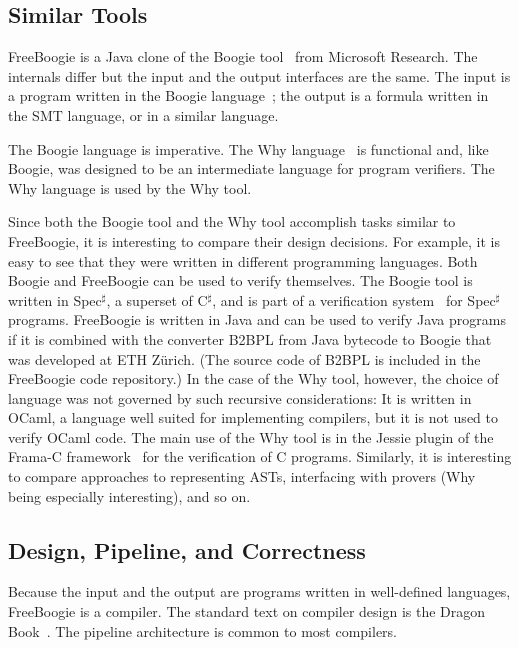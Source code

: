 \documentclass{llncs}
\newcommand{\csharp}{C$^\sharp$\xspace}
\newcommand{\specsharp}{Spec$^\sharp$\xspace}
\begin{document}
\subsection{Similar Tools}

FreeBoogie is a Java clone of the Boogie
tool~\cite{barnett2005boogie} from Microsoft Research. The
internals differ but the input and the output interfaces
are the same. The input is a program written in the Boogie
language~\cite{leino2008boogie,leino2010boogie}; the output is a
formula written in the SMT language, or in a similar language.

The Boogie language is imperative. The Why
language~\cite{filliatre2007why} is functional and, like
Boogie, was designed to be an intermediate language for program
verifiers. The Why language is used by the Why tool.

Since both the Boogie tool and the Why tool accomplish tasks
similar to FreeBoogie, it is interesting to compare their design
decisions. For example, it is easy to see that they were written
in different programming languages. Both Boogie and FreeBoogie
can be used to verify themselves. The Boogie tool is written in
\specsharp, a superset of \csharp, and is part of a verification
system~\cite{barnett2005spec} for \specsharp programs. FreeBoogie
is written in Java and can be used to verify Java programs if it
is combined with the converter B2BPL from Java bytecode to Boogie
that was developed at ETH Z\"urich. (The source code of B2BPL
is included in the FreeBoogie code repository.) In the case of
the Why tool, however, the choice of language was not governed
by such recursive considerations: It is written in OCaml, a
language well suited for implementing compilers, but it is not
used to verify OCaml code. The main use of the Why tool is in
the Jessie plugin of the Frama-C framework~\cite{framac} for
the verification of C programs. Similarly, it is interesting to
compare approaches to representing ASTs, interfacing with provers
(Why being especially interesting), and so on.

\subsection{Design, Pipeline, and Correctness}

Because the input and the output are programs written in
well-defined languages, FreeBoogie is a compiler. The standard
text on compiler design is the Dragon Book~\cite{aho2007}. The
pipeline architecture is common to most compilers.
\end{document}
